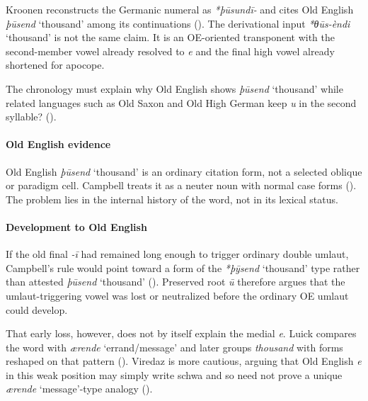 \documentclass[
  british,
  a4paper,
]{article}
\providecommand{\Recon}[1]{\emph{*#1}}
\begin{document}
Kroonen reconstructs the Germanic numeral as {\emph{*þūsundī-}} and
cites Old English {\emph{þūsend}} `thousand' among its continuations
(). The derivational input
\Recon{θūs-èndi} `thousand' is not the same claim. It is an OE-oriented
transponent with the second-member vowel already resolved to \emph{e}
and the final high vowel already shortened for apocope.

The chronology must explain why Old English shows {\emph{þūsend}}
`thousand' while related languages such as Old Saxon and Old High German
keep \emph{u} in the second syllable?
().

\paragraph{Old English evidence}\label{old-english-evidence-108}

Old English \emph{þūsend} `thousand' is an ordinary citation form, not a
selected oblique or paradigm cell. Campbell treats it as a neuter noun
with normal case forms (). The problem lies in the internal history of the word, not in its
lexical status.

\paragraph{Development to Old
English}\label{development-to-old-english-108}

If the old final \emph{-ī} had remained long enough to trigger ordinary
double umlaut, Campbell's rule would point toward a form of the
{\emph{*þȳsend}} `thousand' type rather than attested {\emph{þūsend}}
`thousand' ().
Preserved root \emph{ū} therefore argues that the umlaut-triggering
vowel was lost or neutralized before the ordinary OE umlaut could
develop.

That early loss, however, does not by itself explain the medial
\emph{e}. Luick compares the word with {\emph{ærende}} `errand/message'
and later groups \emph{thousand} with forms reshaped on that pattern
(). Viredaz
is more cautious, arguing that Old English \emph{e} in this weak
position may simply write schwa and so need not prove a unique
\emph{ærende} `message'-type analogy
().
\end{document}
